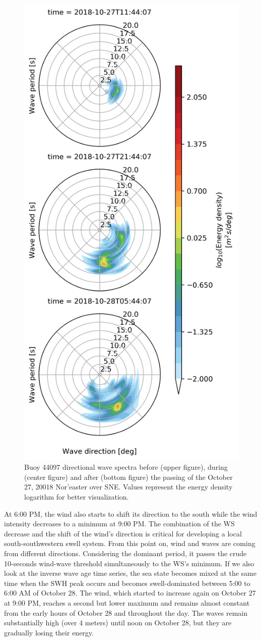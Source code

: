 \begin{figure}[H]
\centering
\includegraphics[width=0.5\linewidth]{Figures/Chapter5/noreaster_oct18_snap.png}
\caption{Buoy 44097 directional wave spectra before (upper figure), during (center figure) and after (bottom figure) the passing of the October 27, 20018 Nor'easter over SNE. Values represent the energy density logarithm for better visualization.}
\label{fig:noreaster_oct18_snap}
\end{figure}


At 6:00 PM, the wind also starts to shift its direction to the south while the wind intensity decreases to a minimum at 9:00 PM. The combination of the WS decrease and the shift of the wind's direction is critical for developing a local south-southwestern swell system. From this point on, wind and waves are coming from different directions. Considering the dominant period, it passes the crude 10-seconds wind-wave threshold simultaneously to the WS's minimum. If we also look at the inverse wave age time series, the sea state becomes mixed at the same time when the SWH peak occurs and becomes swell-dominated between 5:00 to 6:00 AM of October 28. The wind, which started to increase again on October 27 at 9:00 PM, reaches a second but lower maximum and remains almost constant from the early hours of October 28 and throughout the day. The waves remain substantially high (over 4 meters) until noon on October 28, but they are gradually losing their energy.


